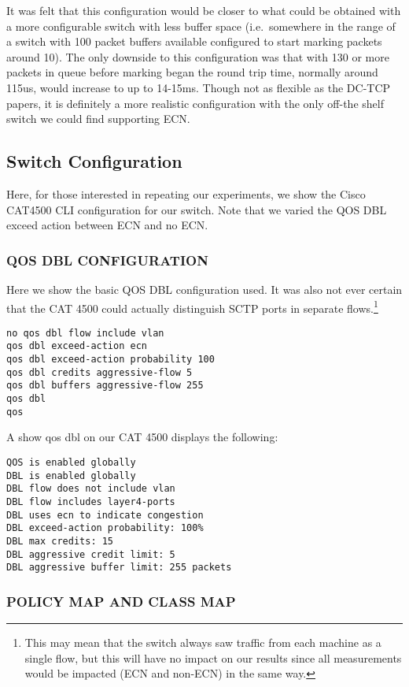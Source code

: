 \documentclass[12pt]{article}
\begin{document}
 It was felt that this configuration would be closer to what could be obtained with a more
 configurable switch with less buffer space (i.e.~somewhere in the range of a switch with
 100 packet buffers available configured to start marking packets around 10).  The only downside
 to this configuration was that with 130 or more packets in queue before marking began the
 round trip time, normally around 115us, would increase to up to 14-15ms.
 Though not as flexible as the DC-TCP papers, it is definitely a more realistic configuration with the only
 off-the shelf  switch we could find supporting ECN.

\subsection{Switch Configuration}

Here, for those interested in repeating our experiments, we show the Cisco CAT4500 CLI
configuration for our switch.  Note that we varied the QOS DBL exceed action between
ECN and no ECN.

\subsubsection{QOS DBL CONFIGURATION}
 
Here we show the basic QOS DBL configuration used. It was
also not ever certain that the CAT 4500 could actually distinguish SCTP ports in separate flows.\footnote{This
may mean that the switch always saw traffic from each machine as a single flow, but this will have no impact on
our results since all measurements would be impacted (ECN and non-ECN) in the same way.}
\begin{verbatim}
no qos dbl flow include vlan
qos dbl exceed-action ecn
qos dbl exceed-action probability 100
qos dbl credits aggressive-flow 5
qos dbl buffers aggressive-flow 255
qos dbl   
qos
\end{verbatim}
A show qos dbl on our CAT 4500 displays the following:
\begin{verbatim}
QOS is enabled globally
DBL is enabled globally
DBL flow does not include vlan
DBL flow includes layer4-ports
DBL uses ecn to indicate congestion
DBL exceed-action probability: 100%
DBL max credits: 15
DBL aggressive credit limit: 5
DBL aggressive buffer limit: 255 packets
\end{verbatim}

\subsubsection {POLICY MAP AND CLASS MAP}
\end{document}
